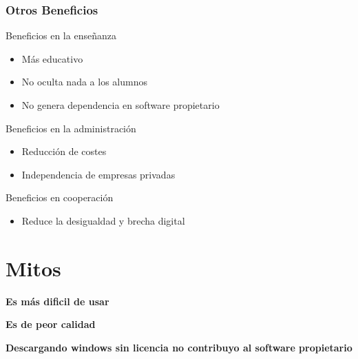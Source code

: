 \documentclass{beamer}
\begin{document}
\begin{frame}\frametitle{Otros Beneficios}
    \begin{block}{Beneficios en la enseñanza}
        \begin{itemize}
            \item Más educativo
            \item No oculta nada a los alumnos
            \item No genera dependencia en software propietario
        \end{itemize}
    \end{block}

    \begin{block}{Beneficios en la administración}
        \begin{itemize}
            \item Reducción de costes
            \item Independencia de empresas privadas
        \end{itemize}
    \end{block}

    \begin{block}{Beneficios en cooperación}
        \begin{itemize}
            \item Reduce la desigualdad y brecha digital
        \end{itemize}
    \end{block}
\end{frame}

\section{Mitos}

\begin{frame}
    \begin{center}
        \textbf{Es más dificil de usar}
    \end{center}
\end{frame}

\begin{frame}
    \begin{center}
        \textbf{Es de peor calidad}
    \end{center}
\end{frame}

\begin{frame}
    \begin{center}
        \textbf{Descargando windows sin licencia no contribuyo al software propietario}
    \end{center}
\end{frame}
\end{document}
